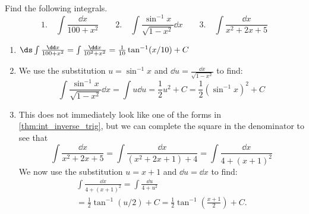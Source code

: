 \begin{example}\label{eg_inv_deriv_harder}
Find the following integrals.
\[
 \text{1.}\quad\int\frac{\dd x}{100+x^2}\qquad
 \text{2.}\quad\int\frac{\sin^{-1} x}{\sqrt{1-x^2}}\dd x\qquad
 \text{3.}\quad\int\frac{\dd x}{x^2+2x+5}
\]
\solution
\begin{enumerate}
\item $\ds\int\frac{\dd x}{100+x^2}=\int\frac{\dd x}{10^2+x^2}=\frac1{10}\tan^{-1}(x/10)+C$
\item We use the substitution $u=\sin^{-1}x$ and $\dd u=\frac{\dd x}{\sqrt{1-x^2}}$ to find:
\[\int\frac{\sin^{-1}x}{\sqrt{1-x^2}}\dd x=\int u\dd u=\frac12 u^2+C=\frac 12\left(\sin^{-1}x\right)^2+C\]
\item This does not immediately look like one of the forms in \autoref{thm:int_inverse_trig}, but we can complete the square in the denominator to see that
\[\int\frac{\dd x}{x^2+2x+5} =\int\frac{\dd x}{(x^2+2x+1)+4}=\int\frac{\dd x}{4+(x+1)^2}\]
We now use the substitution $u=x+1$ and $\dd u=\dd x$ to find:
\begin{multline*}
 \int\frac{\dd x}{4+(x+1)^2} =\int\frac{\dd u}{4+u^2}\\
 =\frac12 \tan^{-1}(u/2)+C =\frac 12\tan^{-1}\left(\frac{x+1}2\right)+C.
\end{multline*}
\end{enumerate}
\end{example}


